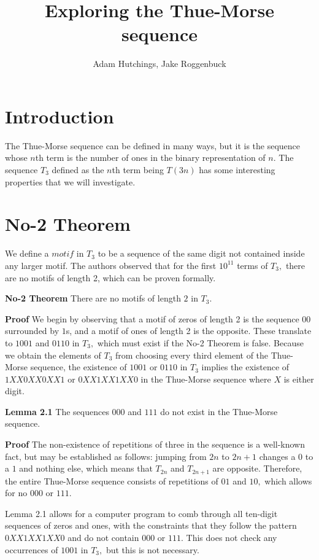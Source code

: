 \documentclass{article}
\begin{document}
\title{Exploring the Thue-Morse sequence}
\author{Adam Hutchings, Jake Roggenbuck}
\maketitle

\section{Introduction}
The Thue-Morse sequence can be defined in many ways, but it is the sequence whose $n$th term is the number of ones in the binary representation of $n.$ The sequence $T_3$ defined as the $n$th term being $T(3n)$ has some interesting properties that we will investigate.

\section{No-2 Theorem}
We define a $motif$ in $T_3$ to be a sequence of the same digit not contained inside any larger motif. The authors observed that for the first $10^11$ terms of $T_3,$ there are no motifs of length 2, which can be proven formally.

\textbf{No-2 Theorem} There are no motifs of length $2$ in $T_3.$

\textbf{Proof}
We begin by observing that a motif of zeros of length 2 is the sequence $00$ surrounded by $1$s, and a motif of ones of length 2 is the opposite. These translate to $1001$ and $0110$ in $T_3,$ which must exist if the No-2 Theorem is false. Because we obtain the elements of $T_3$ from choosing every third element of the Thue-Morse sequence, the existence of $1001$ or $0110$ in $T_3$ implies the existence of $1XX0XX0XX1$ or $0XX1XX1XX0$ in the Thue-Morse sequence where $X$ is either digit.

\textbf{Lemma 2.1} The sequences $000$ and $111$ do not exist in the Thue-Morse sequence.

\textbf{Proof} The non-existence of repetitions of three in the sequence is a well-known fact, but may be established as follows: jumping from $2n$ to $2n+1$ changes a $0$ to a $1$ and nothing else, which means that $T_{2n}$ and $T_{2n+1}$ are opposite. Therefore, the entire Thue-Morse sequence consists of repetitions of $01$ and $10,$ which allows for no $000$ or $111.$

Lemma 2.1 allows for a computer program to comb through all ten-digit sequences of zeros and ones, with the constraints that they follow the pattern $0XX1XX1XX0$ and do not contain $000$ or $111.$ This does not check any occurrences of $1001$ in $T_3,$ but this is not necessary.
\end{document}
